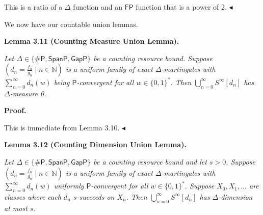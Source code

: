\documentclass[10pt,a4paper]{article}
\begin{document}
This is a ratio of a $\Delta$ function and an $\mathsf{FP}$ function that is a
power of 2.
$\blacktriangleleft$\par




We now have our countable union lemmas.\par





\par\medskip\noindent\textbf{
\textbf{Lemma 3.11}\textbf{ }(Counting Measure Union Lemma)\textbf{.}
}\par



\emph{Let $\Delta\in\{{\mathsf{\#}\mathsf{P}},\mathsf{SpanP},\mathsf{GapP}\}$ be a counting resource bound.
Suppose $\left(d_{n}=\frac{f_{n}}{g_{n}}\mid n\in\mathbb{N}\right)$ is a uniform family of
exact $\Delta$-martingales with $\sum\limits_{n=0}^{\infty}d_{n}(w)$ being $\mathsf{P}$-convergent for all $w\in\{0,1\}^{*}$.
Then $\bigcup\limits_{n=0}^{\infty}S^{\infty}[d_{n}]$ has $\Delta$-measure 0.}\par







\par\medskip\noindent\textbf{Proof.}\par




This is immediate from Lemma 3.10.
$\blacktriangleleft$\par





\par\medskip\noindent\textbf{
\textbf{Lemma 3.12}\textbf{ }(Counting Dimension Union Lemma)\textbf{.}
}\par



\emph{Let $\Delta\in\{{\mathsf{\#}\mathsf{P}},\mathsf{SpanP},\mathsf{GapP}\}$ be a counting resource bound and let $s>0$.
Suppose $\left(d_{n}=\frac{f_{n}}{g_{n}}\mid n\in\mathbb{N}\right)$ is a uniform family of
exact $\Delta$-martingales with $\sum\limits_{n=0}^{\infty}d_{n}(w)$ uniformly
$\mathsf{P}$-convergent for all $w\in\{0,1\}^{*}$. Suppose $X_{0},X_{1},\ldots$ are classes where each $d_{n}$ $s$-succeeds on $X_{n}$.
Then $\bigcup\limits_{n=0}^{\infty}S^{\infty}[d_{n}]$
has $\Delta$-dimension at most $s$.}\par
\end{document}
